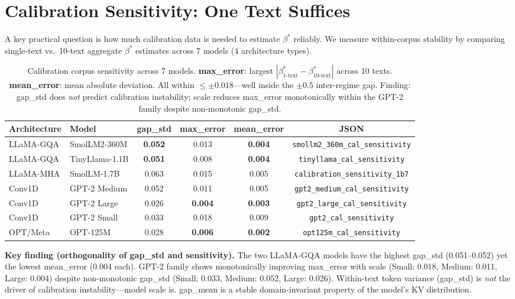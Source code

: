 \documentclass{article}
\begin{document}
\section{Calibration Sensitivity: One Text Suffices}
\label{sec:sensitivity}

A key practical question is how much calibration data is needed to estimate $\beta^*$ reliably.
We measure within-corpus stability by comparing single-text vs.\ 10-text aggregate $\beta^*$
estimates across 7 models (4 architecture types).

\begin{table}[h]
\centering
\caption{Calibration corpus sensitivity across 7 models. \textbf{max\_error}: largest
$|\beta^*_\text{1-text} - \beta^*_\text{10-text}|$ across 10 texts.
\textbf{mean\_error}: mean absolute deviation. All within $\leq\pm0.018$---well inside the
$\pm 0.5$ inter-regime gap. Finding: gap\_std does \emph{not} predict calibration instability;
scale reduces max\_error monotonically within the GPT-2 family despite non-monotonic gap\_std.}
\begin{tabular}{llcccc}
\toprule
Architecture & Model & gap\_std & max\_error & mean\_error & JSON \\
\midrule
LLaMA-GQA   & SmolLM2-360M  & \textbf{0.052} & 0.013 & \textbf{0.004} & \texttt{smollm2\_360m\_cal\_sensitivity} \\
LLaMA-GQA   & TinyLlama-1.1B & \textbf{0.051} & 0.008 & \textbf{0.004} & \texttt{tinyllama\_cal\_sensitivity} \\
LLaMA-MHA   & SmolLM-1.7B   & 0.063 & 0.015 & 0.005 & \texttt{calibration\_sensitivity\_1b7} \\
Conv1D      & GPT-2 Medium  & 0.052 & 0.011 & 0.005 & \texttt{gpt2\_medium\_cal\_sensitivity} \\
Conv1D      & GPT-2 Large   & 0.026 & \textbf{0.004} & \textbf{0.003} & \texttt{gpt2\_large\_cal\_sensitivity} \\
Conv1D      & GPT-2 Small   & 0.033 & 0.018 & 0.009 & \texttt{gpt2\_cal\_sensitivity} \\
OPT/Meta    & OPT-125M      & 0.028 & \textbf{0.006} & \textbf{0.002} & \texttt{opt125m\_cal\_sensitivity} \\
\bottomrule
\end{tabular}
\label{tab:sensitivity}
\end{table}

\textbf{Key finding (orthogonality of gap\_std and sensitivity).}
The two LLaMA-GQA models have the highest gap\_std (0.051--0.052) yet the lowest mean\_error
(0.004 each). GPT-2 family shows monotonically improving max\_error with scale
(Small: 0.018, Medium: 0.011, Large: 0.004) despite non-monotonic gap\_std
(Small: 0.033, Medium: 0.052, Large: 0.026). Within-text token variance (gap\_std) is
\emph{not} the driver of calibration instability---model scale is. gap\_mean is a
stable domain-invariant property of the model's KV distribution.
\end{document}
